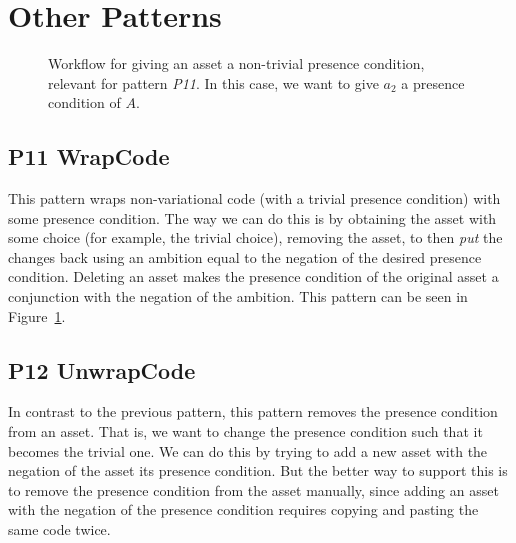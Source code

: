 \section{Other Patterns}
\begin{figure}
  \centering
  \caption{Workflow for giving an asset a non-trivial presence condition, relevant for pattern \emph{P11}. In this case, we want to give $a_2$ a presence condition of $A$.}
  \label{fig:patterns:p11}
\end{figure}
\subsection*{P11 WrapCode}
This pattern wraps non-variational code (with a trivial presence condition)
with some presence condition. The way we can do this is by obtaining the asset
with some choice (for example, the trivial choice), removing the asset, to then
\emph{put} the changes back using an ambition equal to the negation of the
desired presence condition. Deleting an asset makes the presence condition of
the original asset a conjunction with the negation of the ambition. This pattern
can be seen in Figure~\ref{fig:patterns:p11}.

\subsection*{P12 UnwrapCode}
In contrast to the previous pattern, this pattern removes the presence condition
from an asset. That is, we want to change the presence condition such that it
becomes the trivial one. We can do this by trying to add a new asset with the
negation of the asset its presence condition. But the better way to support
this is to remove the presence condition from the asset manually, since
adding an asset with the negation of the presence condition requires copying
and pasting the same code twice.

